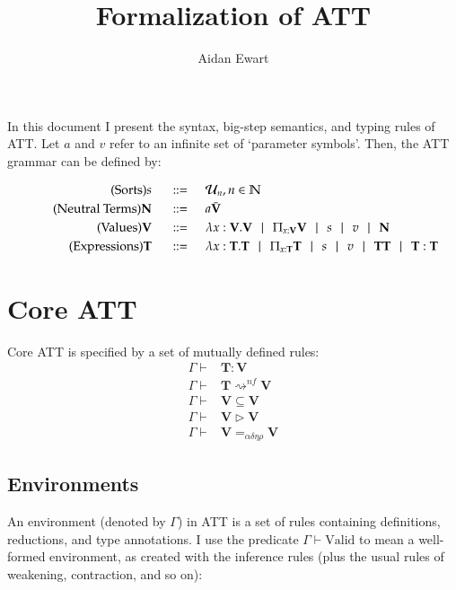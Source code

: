 \documentclass{article}
\author{Aidan Ewart}
\title{Formalization of ATT}
\newcommand{\set}{\mathcal{U}}
\newcommand{\nat}{\mathbb{N}}
\newcommand{\fun}[2]{\lambda #1. #2}
\newcommand{\for}[2]{\Pi_{#1}#2}
\newcommand{\bnfdef}{\hspace{0.5cm} ::= \hspace{0.5cm}}
\newcommand{\alt}{\hspace{0.25cm} | \hspace{0.25cm}}
\newcommand{\bb}{\mathbf}
\newcommand{\evals}{\rightsquigarrow^{nf}}
\begin{document}
\maketitle
In this document I present the syntax, big-step semantics, and typing rules of ATT. Let $a$ and $v$ refer to an infinite set of `parameter symbols'. Then, the ATT grammar can be defined by:

\begin{align*}
    \tag{Sorts}
    s \bnfdef& \set_n, n \in \nat
    \\ \tag{Neutral Terms}
    \bb{N} \bnfdef& a \bar{\bb{V}}
    \\ \tag{Values}
    \bb{V} \bnfdef& \fun{x: \bb{V}} \bb{V} \alt \for{x: \bb{V}} \bb{V} \alt s \alt v \alt \bb{N}
    \\ \tag{Expressions}
    \bb{T} \bnfdef& \fun{x:\bb{T}}{\bb{T}} \alt \for{x : \bb{T}} \bb{T} \alt s \alt v \alt \bb{T T} \alt \bb{T} : \bb{T}
\end{align*}

\section{Core ATT}

Core ATT is specified by a set of mutually defined rules:
\begin{align*}
    \tag{Typing}
    \Gamma \vdash& \bb{T} : \bb{V}
    \\ \tag{Evaluation}
    \Gamma \vdash& \bb{T} \evals \bb{V}
    \\ \tag{Subtyping}
    \Gamma \vdash& \bb{V} \subseteq \bb{V}
    \\ \tag{Conversion}
    \Gamma \vdash& \bb{V} \triangleright \bb{V}
    \\ \tag{Equivalence}
    \Gamma \vdash& \bb{V} =_{\alpha \delta \eta \rho} \bb{V}
\end{align*} 

\subsection{Environments}

An environment (denoted by $\Gamma$) in ATT is a set of rules containing definitions, reductions, and type annotations. I use the predicate $\Gamma \vdash \mathrm{Valid}$ to mean a well-formed environment, as created with the inference rules (plus the usual rules of weakening, contraction, and so on):
\end{document}
